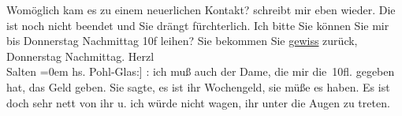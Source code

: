 \begin{ledgroupsized}[t]{13cm}
{{{                  Womöglich kam es zu einem neuerlichen Kontakt?}}}\label{K_L03260-1h} schreibt mir eben wieder.
               Die \label{K_L03260-2v}\label{K_L03260-2h} ist noch nicht beendet und Sie drängt
               fürchterlich. Ich bitte Sie können Sie mir bis Donnerstag{ }Nachmittag{ }10f {\pb}leihen?
               Sie bekommen Sie \uline{gewiss} zurück, Donnerstag{ }Nachmittag.\pend
           \pstart
           Herzl {\\[\baselineskip]}\spacefill\mbox{Salten}\pend
           \leftskip=0em{}{\bigskip}\pstart
           \noindent{}{\pb}{[}hs. Pohl-Glas:{]} \label{K_L03260-3v}\label{K_L03260-3h}: ich muß auch der Dame, die mir die 10fl. gegeben hat, das
               Geld geben. Sie sagte, es ist ihr Wochengeld, sie müße es haben. Es ist doch sehr
               nett von ihr u. ich würde nicht wagen, ihr unter die Augen zu treten.\pend
           
         
         \endnumbering{}\end{ledgroupsized}  \newcommand{\dateiname}{L03260}\newcommand{\titel}{Felix Salten an Arthur Schnitzler, [27. 2. 1897]}\newcommand{\editorInnen}{Martin Anton Müller und Laura Untner}
      